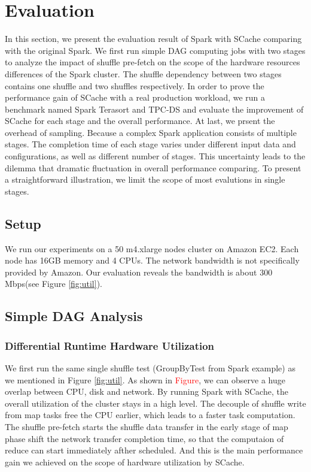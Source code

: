 \section{Evaluation}\label{evaluation}

In this section, we present the evaluation result of Spark with SCache comparing with the original Spark. We first run simple DAG computing jobs with two stages to analyze the impact of shuffle pre-fetch on the scope of the hardware resources differences of the Spark cluster. The shuffle dependency between two stages contains one shuffle and two shuffles respectively. In order to prove the performance gain of SCache with a real production workload, we run a benchmark named Spark Terasort\cite{spark-tera} and TPC-DS\cite{tpcds} and evaluate the improvement of SCache for each stage and the overall performance. At last, we prsent the overhead of sampling. Because a complex Spark application consists of multiple stages. The completion time of each stage varies under different input data and configurations, as well as different number of stages. This uncertainty leads to the dilemma that dramatic fluctuation in overall performance comparing. To present a straightforward illustration, we limit the scope of most evalutions in single stages. 

\subsection{Setup}\label{stepup}
We run our experiments on a 50 m4.xlarge nodes cluster on Amazon EC2\cite{aws}. Each node has 16GB memory and 4 CPUs. The network bandwidth is not specifically provided by Amazon. Our evaluation reveals the bandwidth is about 300 Mbps(see Figure \ref{fig:util}).

\subsection{Simple DAG Analysis}

\subsubsection{Differential Runtime Hardware Utilization} 
We first run the same single shuffle test (GroupByTest from Spark example\cite{sparksource}) as we mentioned in Figure \ref{fig:util}. As shown in \textcolor{red}{Figure}, we can observe a huge overlap between CPU, disk and network. By running Spark with SCache, the overall utilization of the cluster stays in a high level. The decouple of shuffle write from map tasks free the CPU earlier, which leads to a faster task computation. The shuffle pre-fetch starts the shuffle data transfer in the early stage of map phase shift the network transfer completion time, so that the computaion of reduce can start immediately afther scheduled. And this is the main performance gain we achieved on the scope of hardware utilization by SCache.

